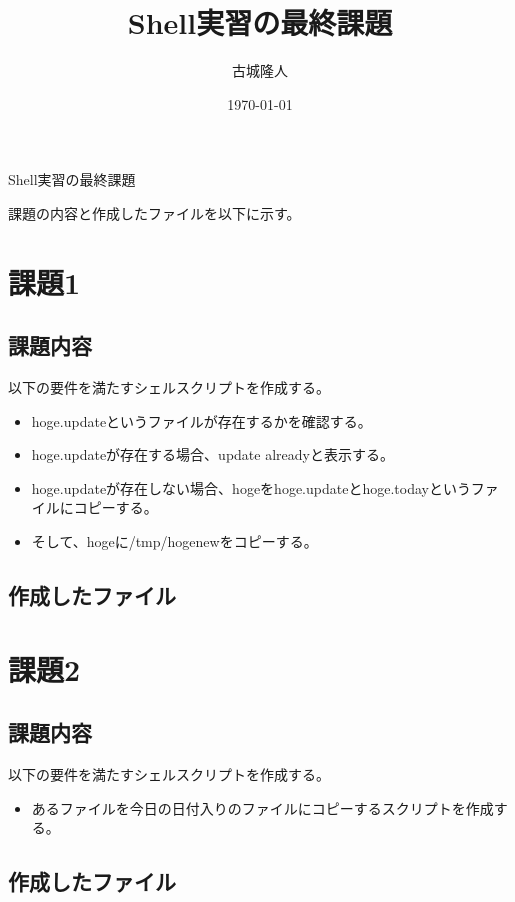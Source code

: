 \documentclass[a4paper,11pt]{jsarticle}
\begin{document}
\title{Shell実習の最終課題}
\author{古城隆人}
\date{\today}
\maketitle


\newpage
\begin{center}
  \begin{center}
    \Huge Shell実習の最終課題
  \end{center}
\end{center}
課題の内容と作成したファイルを以下に示す。
\section{課題1}
\subsection{課題内容}
以下の要件を満たすシェルスクリプトを作成する。
\begin{itemize}
  \item hoge.updateというファイルが存在するかを確認する。
  \item hoge.updateが存在する場合、update alreadyと表示する。
  \item hoge.updateが存在しない場合、hogeをhoge.updateとhoge.{today}というファイルにコピーする。
  \item そして、hogeに/tmp/hogenewをコピーする。
\end{itemize}
\subsection{作成したファイル}



\section{課題2}
\subsection{課題内容}
以下の要件を満たすシェルスクリプトを作成する。
\begin{itemize}
  \item あるファイルを今日の日付入りのファイルにコピーするスクリプトを作成する。
\end{itemize}
\subsection{作成したファイル}

\end{document}
